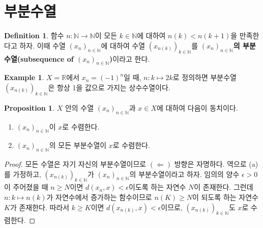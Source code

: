\documentclass[11pt]{book}
\numberwithin{equation}{chapter}
\def\NN{\mathbb{N}}
\def\RR{\mathbb{R}}
\def\eps{\epsilon}
\theoremstyle{definition}
\newtheorem{prop}[thm]{Proposition}
\newtheorem{defn}[thm]{Definition}
\newtheorem*{ex}{Example}
\begin{document}
\section{부분수열}

\begin{defn}
    함수 \(n : \NN \to \NN\)이 모든 \(k \in \NN\)에 대하여 \(n(k) < n(k+1)\)을 만족한다고 하자. 이때 수열 \((x_n)_{n \in \NN}\)에 대하여 수열 \((x_{n(k)})_{k \in \NN}\)를 \textbf{\((x_n)_{n \in \NN}\)의 부분수열(subsequence of \((x_n)_{n \in \NN}\))}이라고 한다.
\end{defn}

\begin{ex}
    \(X = \RR\)에서 \(x_n = (-1)^{n}\)일 때, \(n : k \mapsto 2k\)로 정의하면 부분수열 \((x_{n(k)})_{k \in \NN}\)은 항상 1을 값으로 가지는 상수수열이다.
\end{ex}

\begin{prop}
    \(X\) 안의 수열 \((x_n)_{n \in \NN}\)과 \(x \in X\)에 대하여 다음이 동치이다.
    \begin{enumerate} [label=(\alph*), leftmargin=2\parindent]
        \item \((x_n)_{n \in \NN}\)이 \(x\)로 수렴한다.
        \item \((x_n)_{n \in \NN}\)의 모든 부분수열이 \(x\)로 수렴한다.
    \end{enumerate}
\end{prop}
\begin{proof}
    모든 수열은 자기 자신의 부분수열이므로 \((\Leftarrow)\) 방향은 자명하다. 역으로 (a)를 가정하고, \((x_{n(k)})_{k \in \NN}\)가 \((x_n)_{n \in \NN}\)의 부분수열이라고 하자. 임의의 양수 \(\eps > 0\)이 주어졌을 때 \(n \ge N\)이면 \(d(x_n, x) < \eps\)이도록 하는 자연수 \(N\)이 존재한다. 그런데 \(n : k \mapsto n(k)\)가 자연수에서 증가하는 함수이므로 \(n(K) \ge N\)이 되도록 하는 자연수 \(K\)가 존재한다. 따라서 \(k \ge K\)이면 \(d(x_{n(k)}, x) < \eps\)이므로, \((x_{n(k)})_{k \in \NN}\)도 \(x\)로 수렴한다.
\end{proof}
\end{document}

